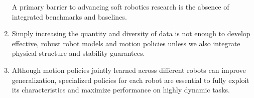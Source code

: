 \documentclass{propositions}
\begin{document}
\begin{enumerate}
    A primary barrier to advancing soft robotics research is the absence of integrated benchmarks and baselines.
    \item %
    Simply increasing the quantity and diversity of data is not enough to develop effective, robust robot models and motion policies unless we also integrate physical structure and stability guarantees.
    \item %
    Although motion policies jointly learned across different robots can improve generalization, specialized policies for each robot are essential to fully exploit its characteristics and maximize performance on highly dynamic tasks.

\end{enumerate}
\end{document}
